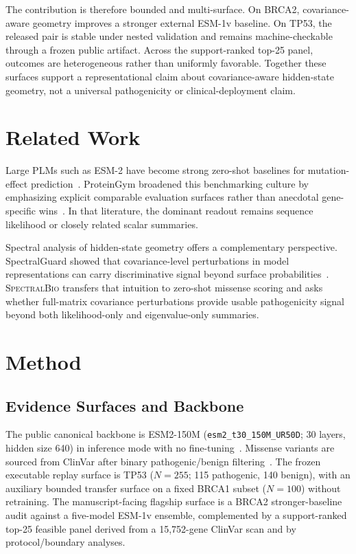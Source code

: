 \documentclass[10pt,twocolumn,letterpaper]{article}
\newcommand{\methodname}{\textsc{SpectralBio}}
\begin{document}
The contribution is therefore bounded and multi-surface. On BRCA2, covariance-aware
geometry improves a stronger external ESM-1v baseline. On TP53, the released pair is
stable under nested validation and remains machine-checkable through a frozen public
artifact. Across the support-ranked top-25 panel, outcomes are heterogeneous rather
than uniformly favorable. Together these surfaces support a representational claim
about covariance-aware hidden-state geometry, not a universal pathogenicity or
clinical-deployment claim.

\section{Related Work}\label{sec:related}

Large PLMs such as ESM-2 have become strong zero-shot baselines for mutation-effect
prediction~\cite{lin2023evolutionary,meier2021language}. ProteinGym broadened this
benchmarking culture by emphasizing explicit comparable evaluation surfaces rather
than anecdotal gene-specific wins~\cite{notin2023proteingym}. In that literature,
the dominant readout remains sequence likelihood or closely related scalar summaries.

Spectral analysis of hidden-state geometry offers a complementary perspective.
SpectralGuard showed that covariance-level perturbations in model representations can
carry discriminative signal beyond surface probabilities~\cite{bonetto2026spectralguard}.
\methodname{} transfers that intuition to zero-shot missense scoring and asks whether
full-matrix covariance perturbations provide usable pathogenicity signal beyond both
likelihood-only and eigenvalue-only summaries.

\section{Method}\label{sec:method}

\subsection{Evidence Surfaces and Backbone}

The public canonical backbone is ESM2-150M
(\texttt{esm2\_t30\_150M\_UR50D}; 30 layers, hidden size 640) in inference mode
with no fine-tuning~\cite{lin2023evolutionary}. Missense variants are sourced from
ClinVar after binary pathogenic/benign filtering~\cite{landrum2018clinvar}. The
frozen executable replay surface is TP53 ($N=255$; 115 pathogenic, 140 benign),
with an auxiliary bounded transfer surface on a fixed BRCA1 subset ($N=100$) without
retraining. The manuscript-facing flagship surface is a BRCA2 stronger-baseline audit
against a five-model ESM-1v ensemble, complemented by a support-ranked top-25 feasible
panel derived from a 15,752-gene ClinVar scan and by protocol/boundary analyses.
\end{document}
